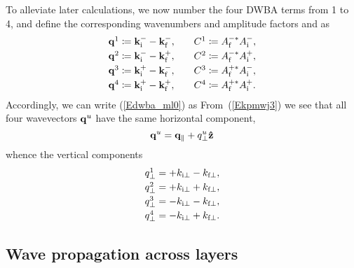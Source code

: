 To alleviate later calculations,
we now number the four DWBA terms from 1 to 4,
and define the corresponding wavenumbers and amplitude factors and as
\begin{equation}
  \begin{array}{l@{\hspace{2em}}l}
    \q^1 \coloneqq  \k^-_\ti - \k^-_\tf,& C^1 \coloneqq  A^{-*}_\tf A^-_\ti, \\[.6ex]
    \q^2 \coloneqq  \k^-_\ti - \k^+_\tf,& C^2 \coloneqq  A^{-*}_\tf A^+_\ti, \\[.6ex]
    \q^3 \coloneqq  \k^+_\ti - \k^-_\tf,& C^3 \coloneqq  A^{+*}_\tf A^-_\ti, \\[.6ex]
    \q^4 \coloneqq  \k^+_\ti - \k^+_\tf,& C^4 \coloneqq  A^{+*}_\tf A^+_\ti.
  \end{array}
\end{equation}
Accordingly, we can write (\ref{Edwba_ml0}) as
From~(\ref{Ekpmwj3}) we see that all four wavevectors $\mathbf{q}^u$
have the same horizontal component,
\begin{equation}\label{Eqpp}
  \mathbf{q}^u = \mathbf{q}_\parallel + q^u_\perp \mathbf{\hat z}
\end{equation}
whence the vertical components
\begin{equation}
    \begin{array}{l}
  q^1_\perp = +k_{\text{i}\perp  } -k_{\text{f}\perp},\\[.6ex]
  q^2_\perp = +k_{\text{i}\perp  } +k_{\text{f}\perp},\\[.6ex]
  q^3_\perp = -k_{\text{i}\perp  } -k_{\text{f}\perp},\\[.6ex]
  q^4_\perp = -k_{\text{i}\perp  } +k_{\text{f}\perp}.
    \end{array}
\end{equation}

\subsection{Wave propagation across layers}\label{Sacrolay}

%
%
%

